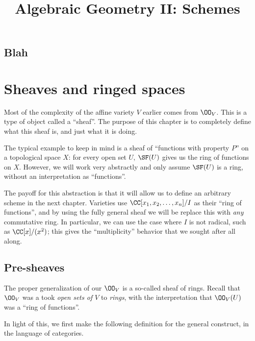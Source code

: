 \documentclass[11pt]{scrreprt}
\begin{document}
\title{Algebraic Geometry II: Schemes}
\maketitle

\tableofcontents

\section{Blah}
\label{thm:reg_func_distinguish_open}
\label{ex:product_ring}

\chapter{Sheaves and ringed spaces}
Most of the complexity of the affine variety $V$ earlier comes from $\OO_V$.
This is a type of object called a ``sheaf''.
The purpose of this chapter is to completely define what this sheaf is,
and just what it is doing.

The typical example to keep in mind is a sheaf of
``functions with property $P$'' on a topological space $X$:
for every open set $U$, $\SF(U)$ gives us the ring of functions on $X$.
However, we will work very abstractly and only assume $\SF(U)$
is a ring, without an interpretation as ``functions''.

The payoff for this abstraction is that it will
allow us to define an arbitrary scheme in the next chapter.
Varieties use $\CC[x_1, x_2, \dots, x_n] / I$ as their ``ring of functions'',
and by using the fully general sheaf we will be replace this
with \emph{any} commutative ring.
In particular, we can use the case where $I$ is not radical, such as
$\CC[x] / (x^2)$; this gives the ``multiplicity''
behavior that we sought after all along.  

\section{Pre-sheaves}

The proper generalization of our $\OO_V$ is a so-called sheaf of rings.
Recall that $\OO_V$ was a took \emph{open sets of $V$} to \emph{rings},
with the interpretation that $\OO_V(U)$ was a ``ring of functions''.

In light of this, we first make the following definition
for the general construct, in the language of categories.
\end{document}
